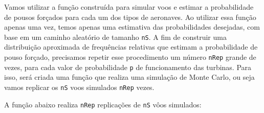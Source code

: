 \documentclass[
]{book}
\newenvironment{Shaded}{\begin{snugshade}}{\end{snugshade}}
\newcommand{\CommentTok}[1]{\textcolor[rgb]{0.56,0.35,0.01}{\textit{#1}}}
\newcommand{\DecValTok}[1]{\textcolor[rgb]{0.00,0.00,0.81}{#1}}
\newcommand{\FloatTok}[1]{\textcolor[rgb]{0.00,0.00,0.81}{#1}}
\newcommand{\KeywordTok}[1]{\textcolor[rgb]{0.13,0.29,0.53}{\textbf{#1}}}
\newcommand{\NormalTok}[1]{#1}
\newcommand{\OperatorTok}[1]{\textcolor[rgb]{0.81,0.36,0.00}{\textbf{#1}}}
\newcommand{\StringTok}[1]{\textcolor[rgb]{0.31,0.60,0.02}{#1}}
\theoremstyle{definition}
\theoremstyle{definition}
\theoremstyle{definition}
\theoremstyle{remark}
\begin{document}
\begin{Shaded}
\end{Shaded}

Vamos utilizar a função construída para simular voos e estimar a probabilidade de pousos forçados para cada um dos tipos de aeronaves. Ao utilizar essa função apenas uma vez, temos apenas uma estimativa das probabilidades desejadas, com base em um caminho aleatório de tamanho \texttt{nS}. A fim de construir uma distribuição aproximada de frequências relativas que estimam a probabilidade de pouso forçado, precisamos repetir esse procedimento um número \texttt{nRep} grande de vezes, para cada valor de probabilidade \texttt{p} de funcionamento das turbinas. Para isso, será criada uma função que realiza uma simulação de Monte Carlo, ou seja vamos replicar os \texttt{nS} voos simulados \texttt{nRep} vezes.

A função abaixo realiza \texttt{nRep} replicações de \texttt{nS} vôos simulados:
\end{document}
